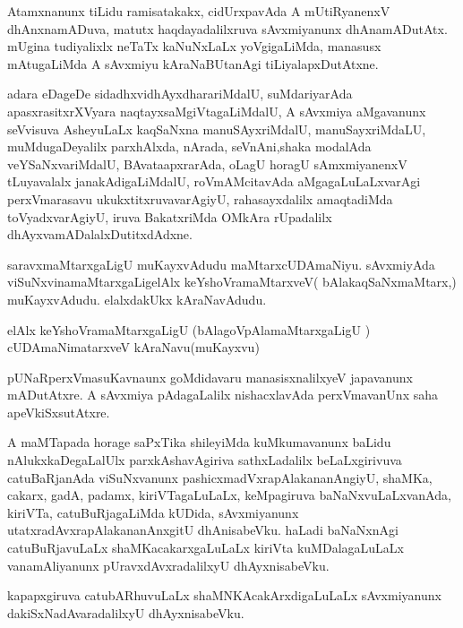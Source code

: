 \documentclass{article}
\begin{document}
\begin{mn}%
Atamxnanunx tiLidu ramisatakakx, cidUrxpavAda A mUtiRyanenxV  dhAnxnamADuva, matutx 
haqdayadalilxruva sAvxmiyanunx dhAnamADutAtx. mUgina tudiyalixlx neTaTx kaNuNxLaLx 
yoVgigaLiMda, manasusx mAtugaLiMda A sAvxmiyu kAraNaBUtanAgi tiLiyalapxDutAtxne.
\end{mn}

\begin{mn}%
adara eDageDe sidadhxvidhAyxdharariMdalU, suMdariyarAda apasxrasitxrXVyara 
naqtayxsaMgiVtagaLiMdalU, A sAvxmiya aMgavanunx seVvisuva AsheyuLaLx kaqSaNxna 
manuSAyxriMdalU, manuSayxriMdaLU, muMdugaDeyalilx parxhAlxda, nArada, seVnAni,shaka 
modalAda veYSaNxvariMdalU, BAvataapxrarAda, oLagU horagU sAmxmiyanenxV tLuyavalalx 
janakAdigaLiMdalU, roVmAMcitavAda aMgagaLuLaLxvarAgi perxVmarasavu ukukxtitxruvavarAgiyU, 
rahasayxdalilx amaqtadiMda toVyadxvarAgiyU, iruva BakatxriMda OMkAra rUpadalilx 
dhAyxvamADalalxDutitxdAdxne.
\end{mn}

\begin{mn}%
saravxmaMtarxgaLigU muKayxvAdudu maMtarxcUDAmaNiyu. sAvxmiyAda viSuNxvinamaMtarxgaLigelAlx 
keYshoVramaMtarxveV( bAlakaqSaNxmaMtarx,) muKayxvAdudu. elalxdakUkx kAraNavAdudu.
\end{mn}

\begin{mn}%
elAlx keYshoVramaMtarxgaLigU (bAlagoVpAlamaMtarxgaLigU ) cUDAmaNimatarxveV kAraNavu(muKayxvu)
\end{mn}

\begin{mn}%
pUNaRperxVmasuKavnaunx goMdidavaru manasisxnalilxyeV japavanunx mADutAtxre. A sAvxmiya 
pAdagaLalilx nishacxlavAda perxVmavanUnx saha apeVkiSxsutAtxre.
\end{mn}

\begin{mn}%
A maMTapada horage saPxTika shileyiMda kuMkumavanunx baLidu nAlukxkaDegaLalUlx 
parxkAshavAgiriva sathxLadalilx beLaLxgirivuva catuBaRjanAda viSuNxvanunx 
pashicxmadVxrapAlakananAngiyU, shaMKa, cakarx, gadA, padamx, kiriVTagaLuLaLx, keMpagiruva 
baNaNxvuLaLxvanAda, kiriVTa, catuBuRjagaLiMda kUDida, sAvxmiyanunx 
utatxradAvxrapAlakananAnxgitU dhAnisabeVku. haLadi baNaNxnAgi catuBuRjavuLaLx 
shaMKacakarxgaLuLaLx kiriVta kuMDalagaLuLaLx vanamAliyanunx pUravxdAvxradalilxyU 
dhAyxnisabeVku.
\end{mn}

\begin{mn}%
kapapxgiruva catubARhuvuLaLx shaMNKAcakArxdigaLuLaLx sAvxmiyanunx dakiSxNadAvaradalilxyU 
dhAyxnisabeVku.
\end{mn}
\end{document}
